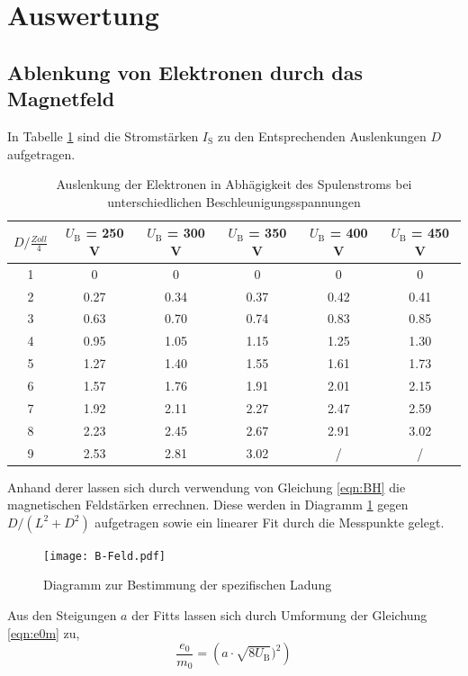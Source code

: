 \section{Auswertung}
\label{sec:Auswertung}
\subsection{Ablenkung von Elektronen durch das Magnetfeld}
In Tabelle \ref{tab:DIS} sind die Stromstärken $I_\text{S}$ zu den Entsprechenden Auslenkungen $D$ aufgetragen.
\begin{table}
  \centering
  \begin{tabular}{c| c c c c c }
    \toprule
    $D / \frac{Zoll}{4}$ & $U_\text{B}$ = 250 V & $U_\text{B}$ = 300 V & $U_\text{B}$ = 350 V & $U_\text{B}$ = 400 V & $U_\text{B}$ = 450 V \\
    \midrule
    1 &	0	&0	&0	&0	&0	\\
    2 &	0.27	&0.34	&0.37	&0.42	&0.41	\\
    3 &	0.63	&0.70	&0.74	&0.83	&0.85	\\
    4 &	0.95	&1.05	&1.15	&1.25	&1.30	\\
    5 &	1.27	&1.40	&1.55	&1.61	&1.73	\\
    6 &	1.57	&1.76	&1.91	&2.01	&2.15	\\
    7 &	1.92	&2.11 	&2.27	&2.47	&2.59	\\
    8 &	2.23	&2.45	&2.67	&2.91	&3.02	\\
    9 &	2.53	&2.81	&3.02	&/	&/	\\
    \bottomrule
  \end{tabular}
  \caption{Auslenkung der Elektronen in Abhägigkeit des Spulenstroms bei unterschiedlichen Beschleunigungsspannungen}
  \label{tab:DIS}
\end{table}
Anhand derer lassen sich durch verwendung von Gleichung \eqref{eqn:BH} die magnetischen Feldstärken errechnen. Diese werden in Diagramm \ref{fig:bfeld} gegen $D/(L^2+D^2)$ aufgetragen sowie ein linearer Fit durch die Messpunkte gelegt.
\begin{figure}
  \centering
  \texttt{[image: B-Feld.pdf]}
  \caption{Diagramm zur Bestimmung der spezifischen Ladung}
  \label{fig:bfeld}
\end{figure}
Aus den Steigungen $a$ der Fitts lassen sich durch Umformung der Gleichung \eqref{eqn:e0m} zu,
\begin{equation}
  \frac{e_0}{m_0} = \left( a \cdot \sqrt{8 U_\text{B}} )^2 \right)
  \label{eqn:e0m0}
\end{equation}
